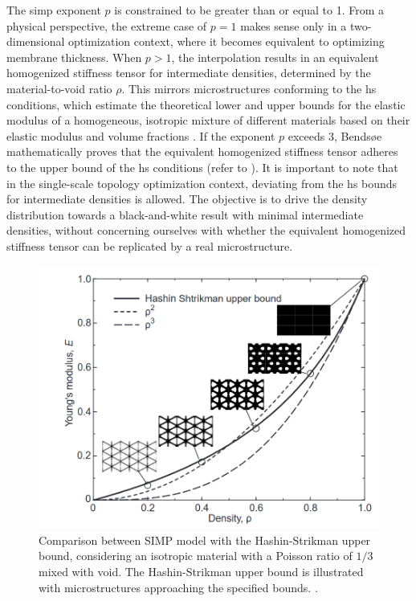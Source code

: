The \gls{simp} exponent $p$ is constrained to be greater than or equal to 1. From a physical perspective, the extreme case of $p = 1$ makes sense only in a two-dimensional optimization context, where it becomes equivalent to optimizing membrane thickness. When $p > 1$, the interpolation results in an equivalent homogenized stiffness tensor for intermediate densities, determined by the material-to-void ratio $\rho$. This mirrors microstructures conforming to the \gls{hs} conditions, which estimate the theoretical lower and upper bounds for the elastic modulus of a homogeneous, isotropic mixture of different materials based on their elastic modulus and volume fractions . If the exponent $p$ exceeds 3, Bendsøe  mathematically proves that the equivalent homogenized stiffness tensor adheres to the upper bound of the \gls{hs} conditions (refer to ). It is important to note that in the single-scale topology optimization context, deviating from the \gls{hs} bounds for intermediate densities is allowed. The objective is to drive the density distribution towards a black-and-white result with minimal intermediate densities, without concerning ourselves with whether the equivalent homogenized stiffness tensor can be replicated by a real microstructure.

\begin{figure}
    \centering
    \includegraphics[width=0.75\linewidth]{figures/02_literature/simp.png}
    \caption{Comparison between SIMP model with the Hashin-Strikman upper bound, considering an isotropic material with a Poisson ratio of $1/3$ mixed with void. The Hashin-Strikman upper bound is illustrated with microstructures approaching the specified bounds. \cite{bendsoe_material_1999}.}
    \label{fig:02_simp}
\end{figure}

